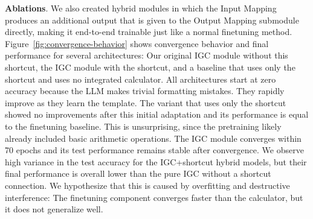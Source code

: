 \documentclass[11pt]{article}
\begin{document}
\textbf{Ablations}.
We also created hybrid modules in which the Input Mapping produces an additional output that is given to the Output Mapping submodule directly, making it end-to-end trainable just like a normal finetuning method.
Figure~\ref{fig:convergence-behavior} shows convergence behavior and final performance for several architectures: Our original IGC module without this shortcut, the IGC module with the shortcut, and a baseline that uses only the shortcut and uses no integrated calculator.
All architectures start at zero accuracy because the LLM makes trivial formatting mistakes. They rapidly improve as they learn the template.
The variant that uses only the shortcut showed no improvements after this initial adaptation and its performance is equal to the finetuning baseline. This is unsurprising, since the pretraining likely already included basic arithmetic operations.
The IGC module converges within 70 epochs and its test performance remains stable after convergence.
We observe high variance in the test accuracy for the IGC+shortcut hybrid models, but their final performance is overall lower than the pure IGC without a shortcut connection.
We hypothesize that this is caused by overfitting and destructive interference: The finetuning component converges faster than the calculator, but it does not generalize well.

\end{document}

